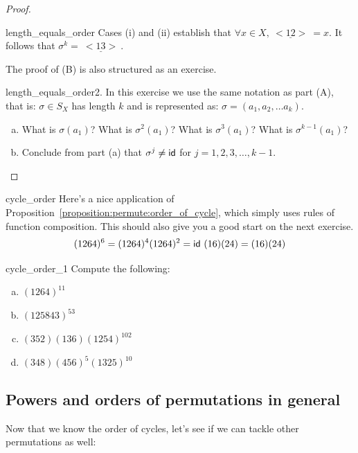 \begin{proof}
\begin{exercise}{length_equals_order}
\noindent
Cases (i) and (ii) establish that  $\forall x \in X, \underline{~<12>~} = x$.  It follows that $\sigma^k = \underline{~<13>~}$.

\end{exercise}

\noindent
The proof of (B) is also structured as an exercise.

\begin{exercise}{length_equals_order2}. In this exercise we use the same notation as part (A), that is: $\sigma \in S_X$ has length $k$ and is represented as: $\sigma = (a_1, a_2, \ldots a_k)$. 
\begin{enumerate}[(a)]
\item
What is $\sigma(a_1)$? What is $\sigma^2(a_1)$? What is $\sigma^3(a_1)$? What is $\sigma^{k-1}(a_1)$?
\item
Conclude from part (a) that  $\sigma^j \neq {\sf{i}d} $ for $j = 1,2,3, \ldots, k-1.$
\end{enumerate}
\end{exercise}
\end{proof}

\begin{example}{cycle_order}
Here's a nice application of Proposition~\ref{proposition:permute:order_of_cycle}, which simply uses rules of function composition.  This should also give you a good start on the next exercise.
\[
(1 2 6 4)^6 = (1 2 6 4)^4 (1 2 6 4)^2 = {\sf{i}d} ~(1 6) (2 4) = (1 6)(2 4) \]
\end{example}

\begin{exercise}{cycle_order_1}
Compute the following:
\begin{multicols}{2}
\begin{enumerate}[(a)]
\item
$(1 2 6 4)^{11}$
\item
$(1 2 5 8 4 3)^{53}$
\item
$(3 5 2)(1 3 6)(1254)^{102}$
\item
$(3 4 8) (4 5 6)^5 (1 3 2 5)^{10}$
\end{enumerate}
\end{multicols}
\end{exercise}

\subsection{Powers and orders of permutations in general}

Now that we know the order of cycles, let's see if we can tackle other permutations as well:

